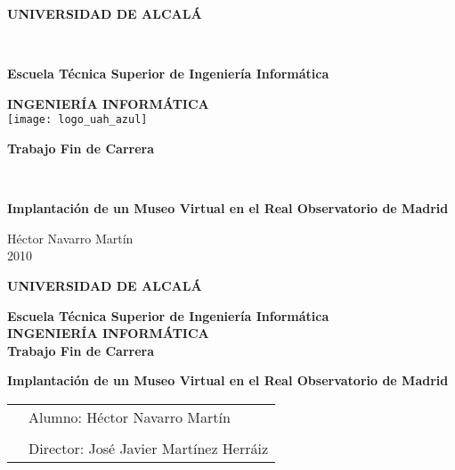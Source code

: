 \thispagestyle{empty}
\large
\vspace{3cm}
\begin{center}

{
\Large\begin{huge}\textbf{UNIVERSIDAD DE ALCALÁ}      \end{huge}}  \\
\vspace{1cm}
\begin{large}\textbf{Escuela Técnica Superior de Ingeniería Informática}\\\end{large}

\vspace{15mm}
{\Large\textbf{INGENIERÍA INFORMÁTICA}}\\
\vspace{3cm}
\texttt{[image: logo\_uah\_azul]}
\vspace{2cm}

\begin{huge}\textbf{Trabajo Fin de Carrera}\end{huge}\\
\vspace{4cm}

{\LARGE \textbf{Implantación de un Museo Virtual en el Real Observatorio de Madrid}}

\end{center}
\vspace{4cm}
\begin{flushright}
  Héctor Navarro Martín\\
  2010
\end{flushright}

\newpage
\clearemptydoublepage
\thispagestyle{empty}
\large
\begin{center}
{\Large\textbf{UNIVERSIDAD DE ALCALÁ}}  \\
\vspace{7mm}

\textbf{Escuela Técnica Superior de Ingeniería Informática}\\

\vspace{7mm}
{\Large\textbf{INGENIERÍA INFORMÁTICA}}\\
\vspace{2cm}
\textbf{Trabajo Fin de Carrera}\\
\vspace{2cm}

{\Large \textbf{Implantación de un Museo Virtual en el Real Observatorio de Madrid}}

\end{center}
\vspace{2cm}
\noindent
\begin{tabular}{p{5cm}l}
&Alumno: Héctor Navarro Martín\\
&\\
&Director: José Javier Martínez Herráiz
\end{tabular}

